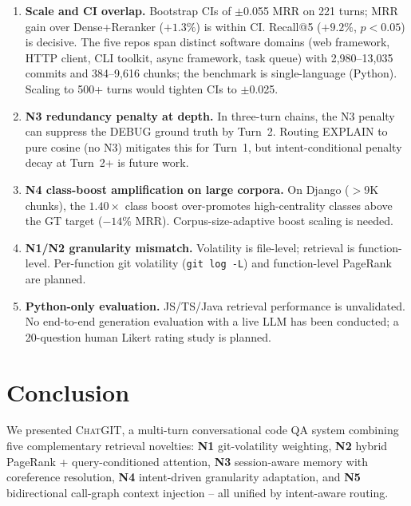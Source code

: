 \documentclass[runningheads]{llncs}
\newcommand{\chatgit}{\textsc{ChatGIT}\xspace}
\begin{document}
\begin{enumerate}[leftmargin=*,label=(\arabic*)]
  \item \textbf{Scale and CI overlap.} Bootstrap CIs of $\pm$0.055 MRR
        on 221 turns; MRR gain over Dense+Reranker ($+1.3\%$) is within CI.
        Recall@5 ($+9.2\%$, $p{<}0.05$) is decisive. The five repos span
        distinct software domains (web framework, HTTP client, CLI toolkit,
        async framework, task queue) with 2,980--13,035 commits and
        384--9,616 chunks; the benchmark is single-language (Python).
        Scaling to 500+ turns would tighten CIs to $\pm$0.025.

  \item \textbf{N3 redundancy penalty at depth.} In three-turn chains,
        the N3 penalty can suppress the DEBUG ground truth by Turn~2.
        Routing EXPLAIN to pure cosine (no N3) mitigates this for Turn~1,
        but intent-conditional penalty decay at Turn~2+ is future work.

  \item \textbf{N4 class-boost amplification on large corpora.} On Django
        ($>$9K chunks), the $1.40\times$ class boost over-promotes high-centrality
        classes above the GT target ($-14\%$ MRR). Corpus-size-adaptive boost
        scaling is needed.

  \item \textbf{N1/N2 granularity mismatch.} Volatility is file-level;
        retrieval is function-level. Per-function git volatility
        (\texttt{git log -L}) and function-level PageRank are planned.

  \item \textbf{Python-only evaluation.} JS/TS/Java retrieval performance
        is unvalidated. No end-to-end generation evaluation with a live LLM
        has been conducted; a 20-question human Likert rating study is planned.
\end{enumerate}

\section{Conclusion}
\label{sec:conc}

We presented \chatgit, a multi-turn conversational code QA system combining
five complementary retrieval novelties: \textbf{N1} git-volatility weighting,
\textbf{N2} hybrid PageRank + query-conditioned attention, \textbf{N3}
session-aware memory with coreference resolution, \textbf{N4} intent-driven
granularity adaptation, and \textbf{N5} bidirectional call-graph context
injection -- all unified by intent-aware routing.
\end{document}
